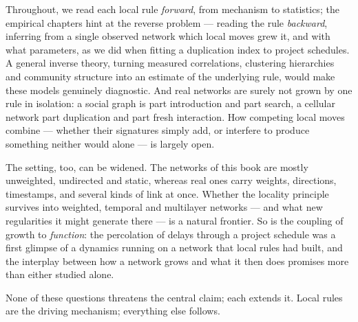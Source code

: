Throughout, we read each local rule \emph{forward}, from
mechanism to statistics; the empirical chapters hint at the reverse problem ---
reading the rule \emph{backward}, inferring from a single observed network which
local moves grew it, and with what parameters, as we did when fitting a
duplication index to project schedules. A general inverse theory, turning measured
correlations, clustering hierarchies and community structure into an estimate of
the underlying rule, would make these models genuinely diagnostic. And real
networks are surely not grown by one rule in isolation: a social graph is part
introduction and part search, a cellular network part duplication and part fresh
interaction. How competing local moves combine --- whether their signatures simply
add, or interfere to produce something neither would alone --- is largely open.

The setting, too, can be widened. The networks of this book are mostly
unweighted, undirected and static, whereas real ones carry weights, directions,
timestamps, and several kinds of link at once. Whether the locality principle
survives into weighted, temporal and multilayer networks --- and what new
regularities it might generate there --- is a natural frontier. So is the coupling
of growth to \emph{function}: the percolation of delays through a project schedule
was a first glimpse of a dynamics running on a network that local rules had built,
and the interplay between how a network grows and what it then does promises more
than either studied alone.

None of these questions threatens the central claim; each extends it. Local rules
are the driving mechanism; everything else follows.
